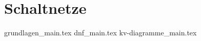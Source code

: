 
\part{Schaltnetze}
\label{part-schaltnetze}

{grundlagen_main.tex}
{dnf_main.tex}
{kv-diagramme_main.tex}